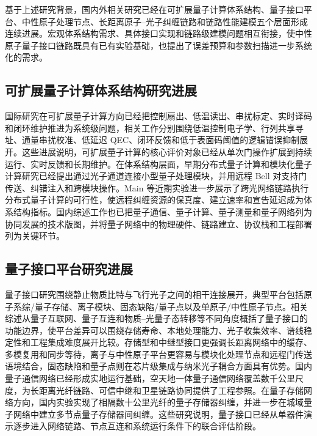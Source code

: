 基于上述研究背景，国内外相关研究已经在可扩展量子计算体系结构、量子接口平台、中性原子处理节点、长距离原子--光子纠缠链路和链路性能建模五个层面形成连续进展。宏观体系结构需求、具体接口实现和链路级建模问题相互衔接，使中性原子量子接口链路既具有已有实验基础，也提出了误差预算和参数扫描进一步系统化的需求。

\subsection{可扩展量子计算体系结构研究进展}

国际研究在可扩展量子计算方向已经把控制扇出、低温读出、串扰标定、实时译码和闭环维护推进为系统级问题，相关工作分别围绕低温控制电子学、行列共享寻址、通量串扰校准、低延迟 QEC、闭环反馈和低于表面码阈值的逻辑错误抑制展开\cite{Ahmad2022ScalableCryoelectronics,Zhao2024RowColumnAddressing,Dai2021FluxCrosstalk,Caune2024LowLatencyQEC,Vepsalainen2022ClosedLoopFeedback,GoogleQuantumAI2025BelowThreshold}。这些进展说明，可扩展量子计算的核心评价对象已经从单次门操作扩展到持续运行、实时反馈和长期维护。在体系结构层面，早期分布式量子计算和模块化量子计算研究已经提出通过光子通道连接小型量子处理模块，并用远程 Bell 对支持门传送、纠错注入和跨模块操作\cite{Jiang2007DistributedQC,Monroe2014ModularQC,Wehner2018QuantumInternetVision}。Main 等近期实验进一步展示了跨光网络链路执行分布式量子计算的可行性，使远程纠缠资源的保真度、建立速率和宣告延迟成为体系结构指标\cite{Main2025DistributedQuantumComputing}。国内综述工作也已把量子通信、量子计算、量子测量和量子网络列为协同发展的技术版图，并将量子网络中的物理硬件、链路建立、协议栈和工程部署列为关键环节\cite{Li2025QIT,Li2023QNS}。

\subsection{量子接口平台研究进展}

量子接口研究围绕静止物质比特与飞行光子之间的相干连接展开，典型平台包括原子系综/量子存储、离子模块、固态缺陷/量子点以及单原子/中性原子节点\cite{Wehner2018QuantumInternetVision,Awschalom2021QuIC,NorthupBlatt2014QuantumInfoTransfer,Covey2023QuantumNetworksNeutralAtomNodes,Reiserer2022CavityEnhancedNetworkNodes}。相关综述从量子互联网、量子互连和物质--光量子态转移等不同角度概括了量子接口的功能边界，使平台差异可以围绕存储寿命、本地处理能力、光子收集效率、谱线稳定性和工程集成难度展开比较\cite{Wehner2018QuantumInternetVision,Awschalom2021QuIC,NorthupBlatt2014QuantumInfoTransfer}。存储型和中继型接口更强调长距离网络中的缓存、多模复用和同步等待，离子与中性原子平台更容易与模块化处理节点和远程门传送语境结合，固态缺陷和量子点则在芯片级集成与纳米光子耦合方面具有优势。国内量子通信网络已经形成实地运行基础，空天地一体量子通信网络覆盖数千公里尺度，为长距离光纤链路、可信中继和卫星链路协同提供了工程参照\cite{Chen2021SpaceGroundQuantumNetwork}。在量子存储网络方向，国内实验实现了相隔数十公里光纤的量子存储器纠缠，并进一步在城域量子网络中建立多节点量子存储器间纠缠\cite{Yu2020EntanglementQuantumMemoriesFiber,Liu2024MemoryMemoryEntanglementMetropolitanNetwork}。这些研究说明，量子接口已经从单器件演示逐步进入网络链路、节点互连和系统运行条件下的联合评估阶段。


